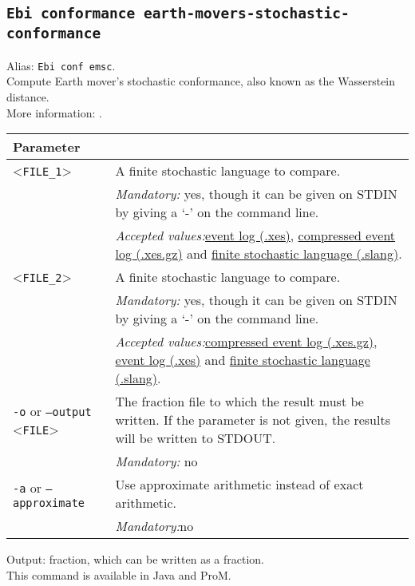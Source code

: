 {\subsection{\texttt{Ebi conformance earth-movers-stochastic-conformance}}
\label{command:Ebi conformance earth-movers-stochastic-conformance}
Alias: \texttt{Ebi conf emsc}.\\
Compute Earth mover's stochastic conformance, also known as the Wasserstein distance.\\
More information: \cite{DBLP:journals/is/LeemansABP21}.\\
\begin{tabularx}{\linewidth}{lX}
\toprule
Parameter \\\midrule
<\texttt{FILE\_1}>&A finite stochastic language to compare.\\
&\textit{Mandatory:} \quad yes, though it can be given on STDIN by giving a `-' on the command line.\\
&\textit{Accepted values:}\quad \hyperref[filehandler:event log]{event log (.xes)}, \hyperref[filehandler:compressed event log]{compressed event log (.xes.gz)} and \hyperref[filehandler:finite stochastic language]{finite stochastic language (.slang)}.\\
<\texttt{FILE\_2}>&A finite stochastic language to compare.\\
&\textit{Mandatory:} \quad yes, though it can be given on STDIN by giving a `-' on the command line.\\
&\textit{Accepted values:}\quad \hyperref[filehandler:compressed event log]{compressed event log (.xes.gz)}, \hyperref[filehandler:event log]{event log (.xes)} and \hyperref[filehandler:finite stochastic language]{finite stochastic language (.slang)}.\\
\texttt{-o} or \texttt{--output} <\texttt{FILE}> &
The fraction file to which the result must be written. If the parameter is not given, the results will be written to STDOUT.\\
&\textit{Mandatory:} \quad no\\
\texttt{-a} or \texttt{--approximate} & Use approximate arithmetic instead of exact arithmetic.\\
&\textit{Mandatory:}\quad no\\
\bottomrule
\end{tabularx}
\noindent Output: fraction, which can be written as a fraction.
\\This command is available in Java and ProM.
}

